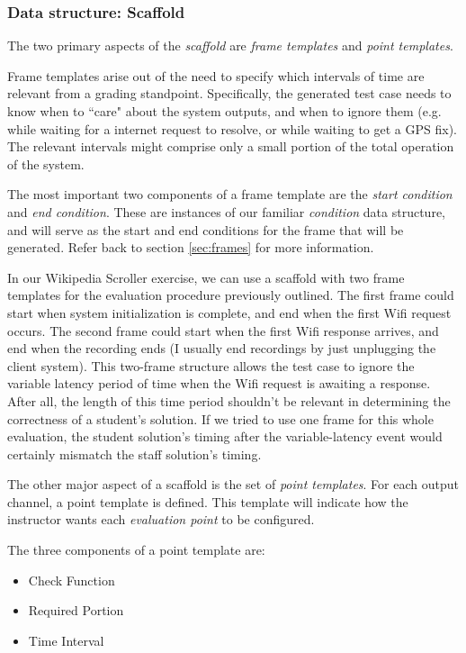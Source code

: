 \documentclass[12pt]{article}
\begin{document}
\subsubsection{Data structure: Scaffold}
The two primary aspects of the \textit{scaffold} are \textit{frame templates} and \textit{point templates}.

Frame templates arise out of the need to specify which intervals of time are relevant from a grading standpoint.  Specifically, the generated test case needs to know when to ``care" about the system outputs, and when to ignore them (e.g. while waiting for a internet request to resolve, or while waiting to get a GPS fix).  The relevant intervals might comprise only a small portion of the total operation of the system.

The most important two components of a frame template are the \textit{start condition} and \textit{end condition}.  These are instances of our familiar \textit{condition} data structure, and will serve as the start and end conditions for the frame that will be generated.  Refer back to section \ref{sec:frames} for more information.

In our Wikipedia Scroller exercise, we can use a scaffold with two frame templates for the evaluation procedure previously outlined.  The first frame could start when system initialization is complete, and end when the first Wifi request occurs.  The second frame could start when the first Wifi response arrives, and end when the recording ends (I usually end recordings by just unplugging the client system).  This two-frame structure allows the test case to ignore the variable latency period of time when the Wifi request is awaiting a response.  After all, the length of this time period shouldn't be relevant in determining the correctness of a student's solution.  If we tried to use one frame for this whole evaluation, the student solution's timing after the variable-latency event would certainly mismatch the staff solution's timing.

The other major aspect of a scaffold is the set of \textit{point templates}.  For each output channel, a point template is defined.  This template will indicate how the instructor wants each \textit{evaluation point} to be configured.

The three components of a point template are:

\begin{itemize}
\item Check Function
\item Required Portion
\item Time Interval
\end{itemize}
\end{document}
